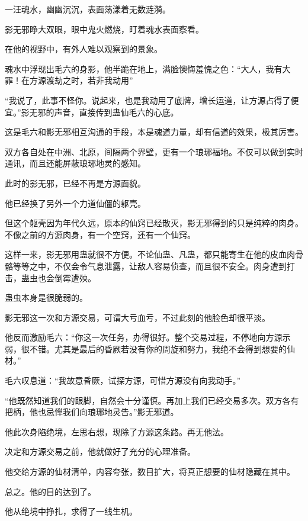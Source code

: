 
\begin{this_body}

一汪魂水，幽幽沉沉，表面荡漾着无数涟漪。

影无邪睁大双眼，眼中鬼火燃烧，盯着魂水表面察看。

在他的视野中，有外人难以观察到的景象。

魂水中浮现出毛六的身影，他半跪在地上，满脸懊悔羞愧之色：“大人，我有大罪！在方源渡劫之时，若非我动用”

“我说了，此事不怪你。说起来，也是我动用了底牌，增长运道，让方源占得了便宜。”影无邪的声音，直接传到蛊仙毛六的心底。

这是毛六和影无邪相互沟通的手段，本是魂道力量，却有信道的效果，极其厉害。

双方各自处在中洲、北原，间隔两个界壁，更有一个琅琊福地。不仅可以做到实时通讯，而且还能屏蔽琅琊地灵的感知。

此时的影无邪，已经不再是方源面貌。

他已经换了另外一个力道仙僵的躯壳。

但这个躯壳因为年代久远，原本的仙窍已经散灭，影无邪得到的只是纯粹的肉身。不像之前的方源肉身，有一个空窍，还有一个仙窍。

这样一来，影无邪用蛊就很不方便。不论仙蛊、凡蛊，都只能寄生在他的皮血肉骨骼等等之中，不仅会令气息泄露，让敌人容易侦查，而且很不安全。肉身遭到打击，蛊虫也会倒霉遭殃。

蛊虫本身是很脆弱的。

影无邪这一次和方源交易，可谓大亏血亏，不过此刻的他脸色却很平淡。

他反而激励毛六：“你这一次任务，办得很好。整个交易过程，不停地向方源示弱，很不错。尤其是最后的昏厥若没有你的周旋和努力，我绝不会得到想要的仙材。”

毛六叹息道：“我故意昏厥，试探方源，可惜方源没有向我动手。”

“他既然知道我们的跟脚，自然会十分谨慎。再加上我们已经交易多次。双方各有把柄，他也忌惮我们向琅琊地灵告。”影无邪道。

他此次身陷绝境，左思右想，现除了方源这条路。再无他法。

决定和方源交易之前，他就做好了充分的心理准备。

他交给方源的仙材清单，内容夸张，数目扩大，将真正想要的仙材隐藏在其中。

总之。他的目的达到了。

他从绝境中挣扎，求得了一线生机。


\end{this_body}
